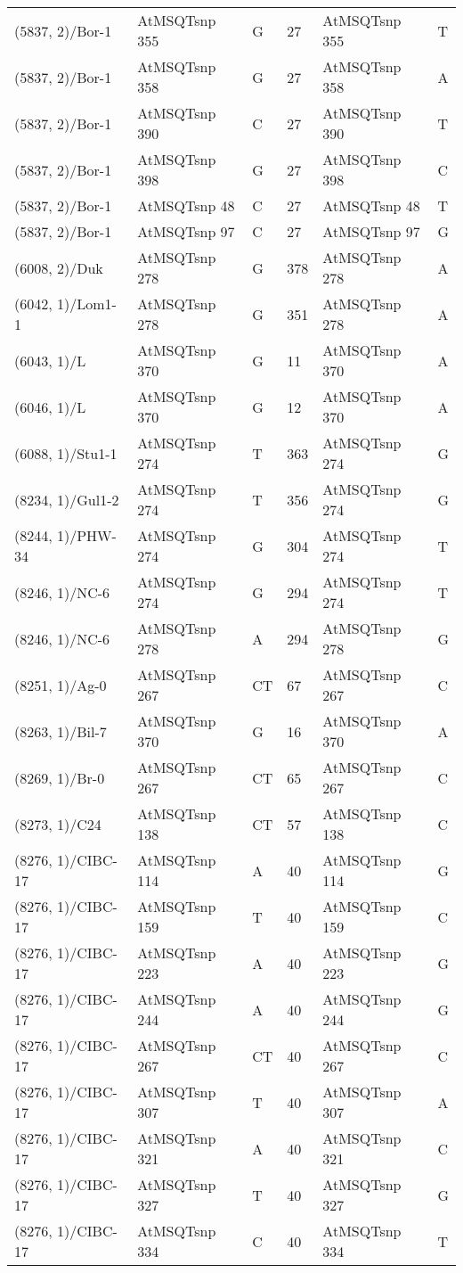 \begin{center}
\begin{longtable}{|l|l|l|l|l|l|}
(5837, 2)/Bor-1&AtMSQTsnp 355&G&27&AtMSQTsnp 355&T\\
(5837, 2)/Bor-1&AtMSQTsnp 358&G&27&AtMSQTsnp 358&A\\
(5837, 2)/Bor-1&AtMSQTsnp 390&C&27&AtMSQTsnp 390&T\\
(5837, 2)/Bor-1&AtMSQTsnp 398&G&27&AtMSQTsnp 398&C\\
(5837, 2)/Bor-1&AtMSQTsnp 48&C&27&AtMSQTsnp 48&T\\
(5837, 2)/Bor-1&AtMSQTsnp 97&C&27&AtMSQTsnp 97&G\\
(6008, 2)/Duk&AtMSQTsnp 278&G&378&AtMSQTsnp 278&A\\
(6042, 1)/Lom1-1&AtMSQTsnp 278&G&351&AtMSQTsnp 278&A\\
(6043, 1)/L&AtMSQTsnp 370&G&11&AtMSQTsnp 370&A\\
(6046, 1)/L&AtMSQTsnp 370&G&12&AtMSQTsnp 370&A\\
(6088, 1)/Stu1-1&AtMSQTsnp 274&T&363&AtMSQTsnp 274&G\\
(8234, 1)/Gul1-2&AtMSQTsnp 274&T&356&AtMSQTsnp 274&G\\
(8244, 1)/PHW-34&AtMSQTsnp 274&G&304&AtMSQTsnp 274&T\\
(8246, 1)/NC-6&AtMSQTsnp 274&G&294&AtMSQTsnp 274&T\\
(8246, 1)/NC-6&AtMSQTsnp 278&A&294&AtMSQTsnp 278&G\\
(8251, 1)/Ag-0&AtMSQTsnp 267&CT&67&AtMSQTsnp 267&C\\
(8263, 1)/Bil-7&AtMSQTsnp 370&G&16&AtMSQTsnp 370&A\\
(8269, 1)/Br-0&AtMSQTsnp 267&CT&65&AtMSQTsnp 267&C\\
(8273, 1)/C24&AtMSQTsnp 138&CT&57&AtMSQTsnp 138&C\\
(8276, 1)/CIBC-17&AtMSQTsnp 114&A&40&AtMSQTsnp 114&G\\
(8276, 1)/CIBC-17&AtMSQTsnp 159&T&40&AtMSQTsnp 159&C\\
(8276, 1)/CIBC-17&AtMSQTsnp 223&A&40&AtMSQTsnp 223&G\\
(8276, 1)/CIBC-17&AtMSQTsnp 244&A&40&AtMSQTsnp 244&G\\
(8276, 1)/CIBC-17&AtMSQTsnp 267&CT&40&AtMSQTsnp 267&C\\
(8276, 1)/CIBC-17&AtMSQTsnp 307&T&40&AtMSQTsnp 307&A\\
(8276, 1)/CIBC-17&AtMSQTsnp 321&A&40&AtMSQTsnp 321&C\\
(8276, 1)/CIBC-17&AtMSQTsnp 327&T&40&AtMSQTsnp 327&G\\
(8276, 1)/CIBC-17&AtMSQTsnp 334&C&40&AtMSQTsnp 334&T\\

\end{longtable}
\end{center}
